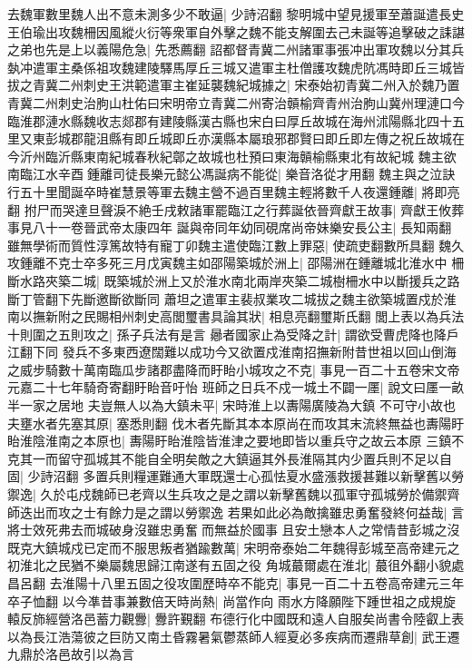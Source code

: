 去魏軍數里魏人出不意未測多少不敢逼|{
	少詩沼翻}
黎明城中望見援軍至蕭誕遣長史王伯瑜出攻魏柵因風縱火衍等衆軍自外擊之魏不能支解圍去己未誕等追擊破之誄諶之弟也先是上以義陽危急|{
	先悉薦翻}
詔都督青冀二州諸軍事張冲出軍攻魏以分其兵埶冲遣軍主桑係祖攻魏建陵驛馬厚丘三城又遣軍主杜僧護攻魏虎阬馮時即丘三城皆拔之青冀二州刺史王洪範遣軍主崔延襲魏紀城據之|{
	宋泰始初青冀二州入於魏乃置青冀二州刺史治朐山杜佑曰宋明帝立青冀二州寄治贑榆齊青州治朐山冀州理漣口今臨淮郡漣水縣魏收志郯郡有建陵縣漢古縣也宋白曰厚丘故城在海州沭陽縣北四十五里又東彭城郡龍沮縣有即丘城即丘亦漢縣本屬琅邪郡賢曰即丘即左傳之祝丘故城在今沂州臨沂縣東南紀城春秋紀鄣之故城也杜預曰東海贑榆縣東北有故紀城}
魏主欲南臨江水辛酉鍾離司徒長樂元懿公馮誕病不能從|{
	樂音洛從才用翻}
魏主與之泣訣行五十里聞誕卒時崔慧景等軍去魏主營不過百里魏主輕將數千人夜還鍾離|{
	將即亮翻}
拊尸而哭達旦聲淚不絶壬戌敕諸軍罷臨江之行葬誕依晉齊獻王故事|{
	齊獻王攸葬事見八十一卷晉武帝太康四年}
誕與帝同年幼同硯席尚帝妹樂安長公主|{
	長知兩翻}
雖無學術而質性淳篤故特有寵丁卯魏主遣使臨江數上罪惡|{
	使疏吏翻數所具翻}
魏久攻鍾離不克士卒多死三月戊寅魏主如邵陽築城於洲上|{
	邵陽洲在鍾離城北淮水中}
柵斷水路夾築二城|{
	既築城於洲上又於淮水南北兩岸夾築二城樹柵水中以斷援兵之路斷丁管翻下先斷邀斷欲斷同}
蕭坦之遣軍主裴叔業攻二城拔之魏主欲築城置戍於淮南以撫新附之民賜相州刺史高閭璽書具論其狀|{
	相息亮翻璽斯氏翻}
閭上表以為兵法十則圍之五則攻之|{
	孫子兵法有是言}
曏者國家止為受降之計|{
	謂欲受曹虎降也降戶江翻下同}
發兵不多東西遼闊難以成功今又欲置戍淮南招撫新附昔世祖以回山倒海之威步騎數十萬南臨瓜步諸郡盡降而盱眙小城攻之不克|{
	事見一百二十五卷宋文帝元嘉二十七年騎奇寄翻盱眙音吁怡}
班師之日兵不戍一城土不闢一㕓|{
	說文曰㕓一畝半一家之居地}
夫豈無人以為大鎮未平|{
	宋時淮上以夀陽廣陵為大鎮}
不可守小故也夫壅水者先塞其原|{
	塞悉則翻}
伐木者先斷其本本原尚在而攻其末流終無益也夀陽盱眙淮陰淮南之本原也|{
	夀陽盱眙淮陰皆淮津之要地即皆以重兵守之故云本原}
三鎮不克其一而留守孤城其不能自全明矣敵之大鎮逼其外長淮隔其内少置兵則不足以自固|{
	少詩沼翻}
多置兵則糧運難通大軍既還士心孤怯夏水盛漲救援甚難以新擊舊以勞禦逸|{
	久於屯戍魏師已老齊以生兵攻之是之謂以新擊舊魏以孤軍守孤城勞於備禦齊師迭出而攻之士有餘力是之謂以勞禦逸}
若果如此必為敵擒雖忠勇奮發終何益哉|{
	言將士效死弗去而城破身沒雖忠勇奮而無益於國事}
且安土戀本人之常情昔彭城之沒既克大鎮城戍已定而不服思叛者猶踰數萬|{
	宋明帝泰始二年魏得彭城至高帝建元之初淮北之民猶不樂屬魏思歸江南遂有五固之役}
角城蕞爾處在淮北|{
	蕞徂外翻小貌處昌呂翻}
去淮陽十八里五固之役攻圍歷時卒不能克|{
	事見一百二十五卷高帝建元三年卒子恤翻}
以今凖昔事兼數倍天時尚熱|{
	尚當作向}
雨水方降願陛下踵世祖之成規旋轅反斾經營洛邑蓄力觀釁|{
	釁許覲翻}
布德行化中國既和遠人自服矣尚書令陸叡上表以為長江浩蕩彼之巨防又南土昏霧暑氣鬱蒸師人經夏必多疾病而遷鼎草創|{
	武王遷九鼎於洛邑故引以為言}
